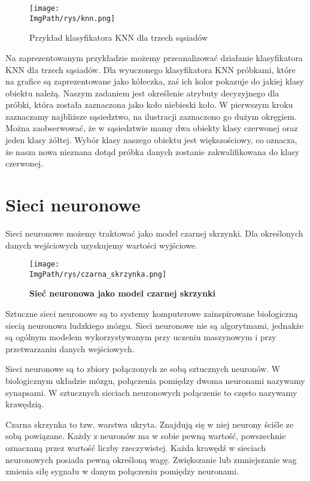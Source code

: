 \documentclass[a4paper,12pt,twoside,openany]{report}
\newcommand{\ImgPath}{.}
\begin{document}
\begin{figure}[H]	
	\centering
	\texttt{[image: \\ImgPath/rys/knn.png]}
	
	\caption{Przykład klasyfikatora KNN dla trzech sąsiadów}
\end{figure}

Na zaprezentowanym przykładzie możemy przeanalizować działanie klasyfikatora KNN dla trzech sąsiadów. Dla wyuczonego klasyfikatora KNN próbkami, które na grafice są zaprezentowane jako kółeczka, zaś ich kolor pokazuje do jakiej klasy obiektu należą. Naszym zadaniem jest określenie atrybuty decyzyjnego dla próbki, która została zaznaczona jako koło niebieski koło. W pierwszym kroku zaznaczamy najbliższe sąsiedztwo, na ilustracji zaznaczono go dużym okręgiem. Można zaobserwować, że w sąsiedztwie mamy dwa obiekty klasy czerwonej oraz jeden klasy żółtej. Wybór klasy naszego obiektu jest większościowy, co oznacza, że nasza nowa nieznana dotąd próbka danych zostanie zakwalifikowana do klasy czerwonej.


\section{Sieci neuronowe}
Sieci neuronowe możemy traktować jako model czarnej skrzynki. Dla określonych danych wejściowych uzyskujemy wartości wyjściowe.

\begin{figure}[H]	
	\centering
	\texttt{[image: \\ImgPath/rys/czarna\_skrzynka.png]}
	
	\caption{  \textbf{Sieć neuronowa jako model czarnej skrzynki}}
\end{figure}

Sztuczne sieci neuronowe są to systemy komputerowe zainspirowane biologiczną siecią neuronowa ludzkiego mózgu. Sieci neuronowe nie są algorytmami, jednakże są ogólnym modelem wykorzystywanym przy uczeniu maszynowym i przy przetwarzaniu danych wejściowych.

Sieci neuronowe są to zbiory połączonych ze sobą sztucznych neuronów. W biologicznym układzie mózgu, połączenia pomiędzy dwoma neuronami nazywamy synapsami. W sztucznych sieciach neuronowych połączenie to często nazywamy krawędzią. 

Czarna skrzynka to tzw. warstwa ukryta. Znajdują się w niej neurony ściśle ze sobą powiązane. Każdy z neuronów ma w sobie pewną wartość, powszechnie oznaczaną przez wartość liczby rzeczywistej. Każda krawędź w sieciach neuronowych posiada pewną określoną wagę. Zwiększanie lub zmniejszanie wag zmienia siłę sygnału w danym połączeniu pomiędzy neuronami.
\end{document}
